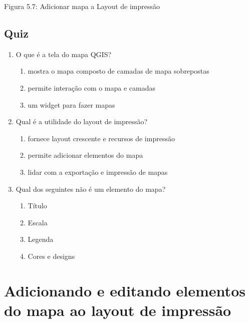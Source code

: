 \documentclass[
]{krantz}
\providecommand{\tightlist}{%
  \setlength{\itemsep}{0pt}\setlength{\parskip}{0pt}}
\begin{document}
Figura 5.7: Adicionar mapa a Layout de impressão

\hypertarget{quiz-12}{%
\subsection{Quiz}\label{quiz-12}}

\begin{enumerate}
\def\labelenumi{\arabic{enumi}.}
\item
  O que é a tela do mapa QGIS?

  \begin{enumerate}
  \def\labelenumii{\alph{enumii}.}
  \tightlist
  \item
    mostra o mapa composto de camadas de mapa sobrepostas
  \item
    permite interação com o mapa e camadas
  \item
    um widget para fazer mapas
  \end{enumerate}
\item
  Qual é a utilidade do layout de impressão?

  \begin{enumerate}
  \def\labelenumii{\alph{enumii}.}
  \tightlist
  \item
    fornece layout crescente e recursos de impressão
  \item
    permite adicionar elementos do mapa
  \item
    lidar com a exportação e impressão de mapas
  \end{enumerate}
\item
  Qual dos seguintes não é um elemento do mapa?

  \begin{enumerate}
  \def\labelenumii{\alph{enumii}.}
  \tightlist
  \item
    Título
  \item
    Escala
  \item
    Legenda
  \item
    Cores e designs
  \end{enumerate}
\end{enumerate}

\hypertarget{adicionando-e-editando-elementos-do-mapa-ao-layout-de-impressuxe3o}{%
\section{Adicionando e editando elementos do mapa ao layout de impressão}\label{adicionando-e-editando-elementos-do-mapa-ao-layout-de-impressuxe3o}}
\end{document}
